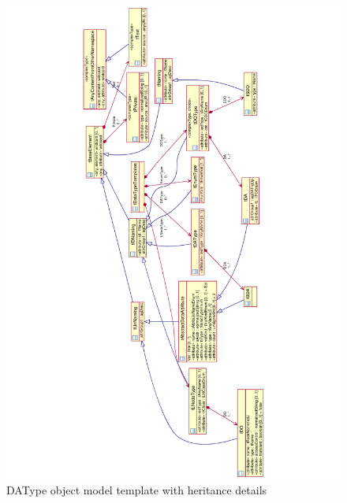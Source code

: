 \begin{landscape}
	\begin{figure}
	  \includegraphics[angle=-90, width=1.0\linewidth]
	  				{chapters/ch-scl/figures/SCL-uml-DATypeTemplate-Deept2}
	  \caption{DAType object model template with heritance details}  
	  \label{fig:pdf-SCL-uml-DATypeTemplate-Deept2}
	\end{figure}
\end{landscape}

